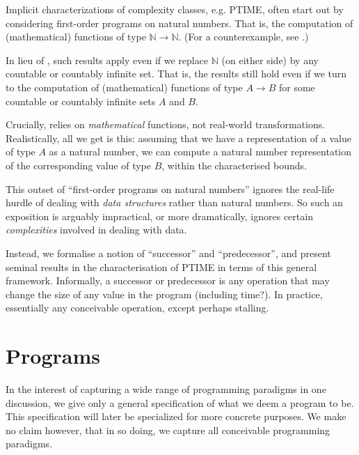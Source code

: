 Implicit characterizations of complexity classes, e.g. PTIME, often start out
by considering first-order programs on natural numbers. That is, the
computation of (mathematical) functions of type $\mathbb{N} \rightarrow
\mathbb{N}$. (For a counterexample, see \cite{hofmann-2003}.) 

In lieu of , such results apply even if we replace
$\mathbb{N}$ (on either side) by any countable or countably infinite set. That
is, the results still hold even if we turn to the computation of (mathematical)
functions of type $A \rightarrow B$ for some countable or countably infinite
sets $A$ and $B$.

Crucially,  relies on \emph{mathematical} functions, not
real-world transformations. Realistically, all we get is this: assuming that we
have a representation of a value of type $A$ as a natural number, we can
compute a natural number representation of the corresponding value of type $B$,
within the characterised bounds.

This outset of ``first-order programs on natural numbers'' ignores the
real-life hurdle of dealing with \emph{data structures} rather than natural
numbers. So such an exposition is arguably impractical, or more dramatically,
ignores certain \emph{complexities} involved in dealing with data.

Instead, we formalise a notion of ``successor'' and ``predecessor'', and
present seminal results in the characterisation of PTIME in terms of this
general framework. Informally, a successor or predecessor is any operation that
may change the size of any value in the program (including time?). In practice,
essentially any conceivable operation, except perhaps stalling.

\section{Programs}


In the interest of capturing a wide range of programming paradigms in one
discussion, we give only a general specification of what we deem a program to
be. This specification will later be specialized for more concrete purposes. We
make no claim however, that in so doing, we capture all conceivable programming
paradigms.

